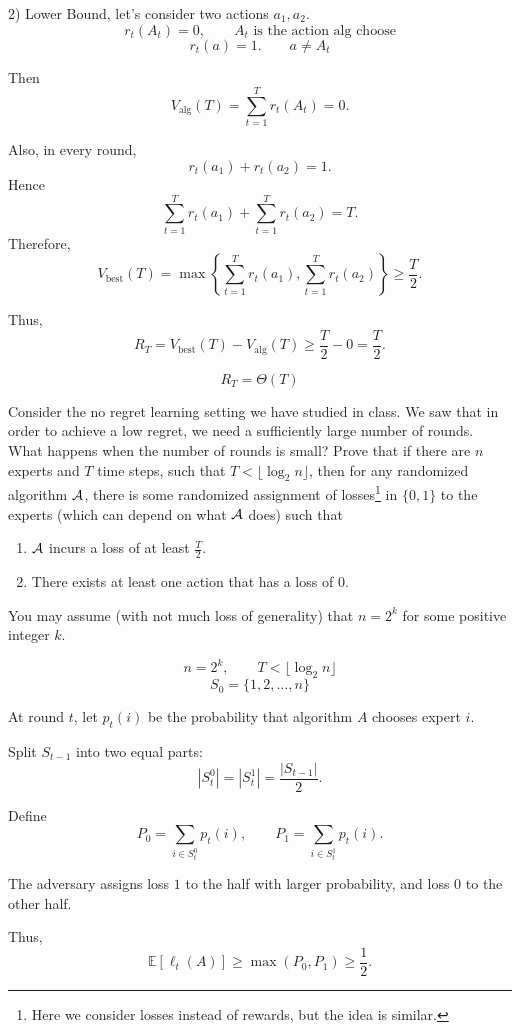 \documentclass[10pt,a4paper,answers]{exam}
\begin{document}
{\begin{questions}
\begin{solution}
2) Lower Bound, let's consider two actions \(a_1,a_2\). 
\[
r_t(A_t)=0, \qquad A_t \text{ is the action alg choose}
\]
\[
r_t(a)=1. \qquad a \neq A_t
\]

Then
\[
V_{\mathrm{alg}}(T)=\sum_{t=1}^T r_t(A_t)=0.
\]

Also, in every round,
\[
r_t(a_1)+r_t(a_2)=1.
\]
Hence
\[
\sum_{t=1}^T r_t(a_1)+\sum_{t=1}^T r_t(a_2)=T.
\]
Therefore,
\[
V_{\mathrm{best}}(T)
=
\max\left\{
\sum_{t=1}^T r_t(a_1),
\sum_{t=1}^T r_t(a_2)
\right\}
\ge \frac{T}{2}.
\]

Thus,
\[
R_T
=
V_{\mathrm{best}}(T)-V_{\mathrm{alg}}(T)
\ge
\frac{T}{2}-0
=
\frac{T}{2}.
\]

\[
R_T=\Theta(T)
\]

\end{solution}
\question[bonus]
Consider the no regret learning setting we have studied in class. We saw that in order to achieve a low regret, we need a sufficiently large number of rounds. 
What happens when the number of rounds is small? Prove that if there are $n$ experts and $T$ time steps, such that $T < \lfloor\log_2 n\rfloor$, then for any randomized algorithm $\cal A$, there is some randomized assignment of losses\footnote{Here we consider losses instead of rewards, but the idea is similar.} in $\{0,1\}$ to the experts (which can depend on what $\cal A$ does) such that 
\begin{enumerate}
	\item 
	$\cal A$ incurs a loss of at least $\frac T2$.
	\item 
	There exists at least one action that has a loss of 0.
\end{enumerate}
You may assume (with not much loss of generality) that $n = 2^k$ for some positive integer $k$.
\begin{solution}
\[
n=2^k,\qquad T<\lfloor \log_2 n\rfloor
\]
\[
S_0=\{1,2,\dots,n\}
\]


At round \(t\), let \(p_t(i)\) be the probability that algorithm \(A\) chooses expert \(i\).

Split \(S_{t-1}\) into two equal parts:
\[
|S_t^0|=|S_t^1|=\frac{|S_{t-1}|}{2}.
\]

Define
\[
P_0=\sum_{i\in S_t^0}p_t(i),
\qquad
P_1=\sum_{i\in S_t^1}p_t(i).
\]

The adversary assigns loss \(1\) to the half with larger probability, and loss \(0\) to the other half.

Thus,
\[
\mathbb{E}[\ell_t(A)]
\ge
\max(P_0,P_1)
\ge
\frac{1}{2}.
\]


\end{solution}
\end{questions}}
\end{document}
